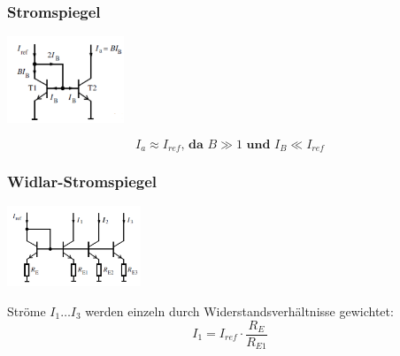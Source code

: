 		\begin{multicols}{2}
		\subsubsection{Stromspiegel}
			\begin{minipage}{3.5cm}
				\includegraphics[width=3.5cm]{./images/stromspiegel}
			\end{minipage}
			\begin{minipage}{4.5cm}
				\begin{equation*}
					I_a \approx I_{ref} \textbf{, da } B \gg 1 \textbf{ und } I_B \ll I_{ref}
				\end{equation*}
			\end{minipage}

		\subsubsection{Widlar-Stromspiegel}
			\begin{minipage}{4cm}
				\includegraphics[width=4cm]{./images/stromspiegel-widlar}
			\end{minipage}
			\begin{minipage}{4cm}
				Ströme $I_1 \dots I_3$ werden einzeln durch Widerstandsverhältnisse gewichtet: \\
				\begin{equation*}
					I_1 = I_{ref} \cdot \frac{R_E}{R_{E1}}
				\end{equation*}
			\end{minipage}	


\end{multicols}
